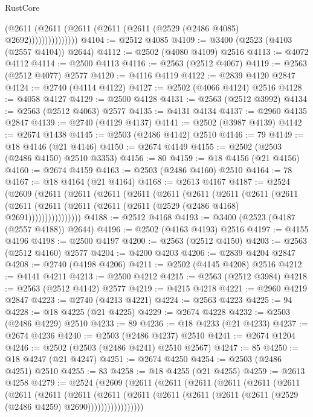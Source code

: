 \begin{lexlean}{RustCore}
\begin{coremodule}
                      (@2611 (@2611 (@2611 (@2611 (@2611 (@2529 (@2486 @4085) @2692)))))))))))))))
@4104 := @2512 @4085
@4109 := @3400 (@2523 (@4103 (@2557 @4104)) @2644)
@4112 := @2502 (@4080 @4109) @2516
@4113 := @4072 @4112
@4114 := @2500 @4113
@4116 := @2563 (@2512 @4067)
@4119 := @2563 (@2512 @4077) @2577
@4120 := @4116 @4119
@4122 := @2839 @4120 @2847
@4124 := @2740 (@4114 @4122)
@4127 := @2502 (@4066 @4124) @2516
@4128 := @4058 @4127
@4129 := @2500 @4128
@4131 := @2563 (@2512 @3992)
@4134 := @2563 (@2512 @4063) @2577
@4135 := @4131 @4134
@4137 := @2960 @4135 @2847
@4139 := @2740 (@4129 @4137)
@4141 := @2502 (@3987 @4139)
@4142 := @2674 @1438
@4145 := @2503 (@2486 @4142) @2510
@4146 := 79
@4149 := @18 @4146 (@21 @4146)
@4150 := @2674 @4149
@4155 := @2502 (@2503 (@2486 @4150) @2510 @3353)
@4156 := 80
@4159 := @18 @4156 (@21 @4156)
@4160 := @2674 @4159
@4163 := @2503 (@2486 @4160) @2510
@4164 := 78
@4167 := @18 @4164 (@21 @4164)
@4168 := @2613 @4167
@4187 := @2524
    (@2609
      (@2611
        (@2611
          (@2611
            (@2611
              (@2611
                (@2611
                  (@2611
                    (@2611
                      (@2611
                        (@2611
                          (@2611 (@2611 (@2611 (@2611 (@2529 (@2486 @4168) @2691))))))))))))))))
@4188 := @2512 @4168
@4193 := @3400 (@2523 (@4187 (@2557 @4188)) @2644)
@4196 := @2502 (@4163 @4193) @2516
@4197 := @4155 @4196
@4198 := @2500 @4197
@4200 := @2563 (@2512 @4150)
@4203 := @2563 (@2512 @4160) @2577
@4204 := @4200 @4203
@4206 := @2839 @4204 @2847
@4208 := @2740 (@4198 @4206)
@4211 := @2502 (@4145 @4208) @2516
@4212 := @4141 @4211
@4213 := @2500 @4212
@4215 := @2563 (@2512 @3984)
@4218 := @2563 (@2512 @4142) @2577
@4219 := @4215 @4218
@4221 := @2960 @4219 @2847
@4223 := @2740 (@4213 @4221)
@4224 := @2563 @4223
@4225 := 94
@4228 := @18 @4225 (@21 @4225)
@4229 := @2674 @4228
@4232 := @2503 (@2486 @4229) @2510
@4233 := 89
@4236 := @18 @4233 (@21 @4233)
@4237 := @2674 @4236
@4240 := @2503 (@2486 @4237) @2510
@4241 := @2674 @1204
@4246 := @2502 (@2503 (@2486 @4241) @2510 @2567)
@4247 := 85
@4250 := @18 @4247 (@21 @4247)
@4251 := @2674 @4250
@4254 := @2503 (@2486 @4251) @2510
@4255 := 83
@4258 := @18 @4255 (@21 @4255)
@4259 := @2613 @4258
@4279 := @2524
    (@2609
      (@2611
        (@2611
          (@2611
            (@2611
              (@2611
                (@2611
                  (@2611
                    (@2611
                      (@2611
                        (@2611
                          (@2611
                            (@2611 (@2611 (@2611 (@2611 (@2529 (@2486 @4259) @2690)))))))))))))))))

\end{coremodule}
\end{lexlean}
